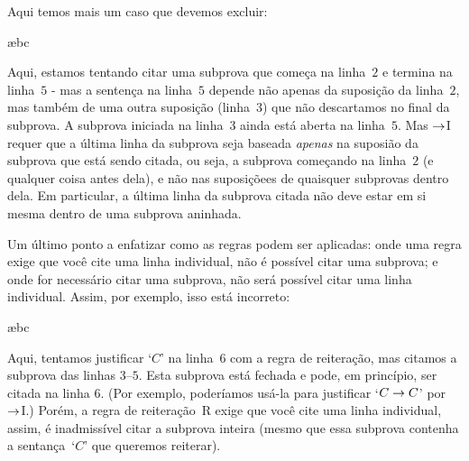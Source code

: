 Aqui temos mais um caso que devemos excluir:
\begin{fitchproof}
\open
	\open
	\ae{bc}
	\close
\close
{}
 
\end{fitchproof}
Aqui, estamos tentando citar uma subprova que come\c ca na linha~$2$ e termina na linha~$5$ -  mas a senten\c ca na linha~$5$ depende n\~ao apenas da suposi\c c\~ao da linha~$2$, mas tamb\'em de uma outra suposi\c c\~ao (linha~$3$) que n\~ao descartamos no final da subprova.  A subprova iniciada na linha~$3$ ainda est\'a aberta na linha~$5$.  Mas $\rightarrow$I requer que a \'ultima linha da subprova seja baseada \emph{apenas} na suposi\~ao da subprova  que est\'a sendo citada, ou seja, a subprova come\c cando na linha~$2$ (e qualquer coisa antes dela), e n\~ao nas suposi\c c\~oees de quaisquer subprovas dentro dela.  Em particular, a \'ultima linha da subprova citada n\~ao deve estar em si mesma dentro de uma subprova aninhada.



Um \'ultimo ponto a enfatizar como as regras podem ser aplicadas: onde uma regra exige que voc\^e cite uma linha individual, n\~ao \'e poss\'ivel citar uma subprova; e onde for necess\'ario citar uma subprova, n\~ao ser\'a poss\'ivel citar uma linha individual.  Assim, por exemplo, isso est\'a incorreto:
\begin{fitchproof}
\open
	\open
	\ae{bc}
	\close
 
\close
{}
\end{fitchproof}
Aqui, tentamos justificar `$C$' na linha~$6$ com a regra de reitera\c c\~ao, mas citamos a subprova das linhas $3$--$5$. Esta subprova est\'a fechada e pode, em princ\'ipio, ser citada na linha 6.  (Por exemplo, poder\'iamos us\'a-la para justificar 
 `$C \rightarrow C$' por $\rightarrow$I.) Por\'em,  a regra de reitera\c c\~ao~R exige que voc\^e cite uma linha individual, assim, \'e inadmiss\'ivel citar a subprova inteira (mesmo que essa subprova  contenha a sentan\c ca~`$C$'  que queremos reiterar).

